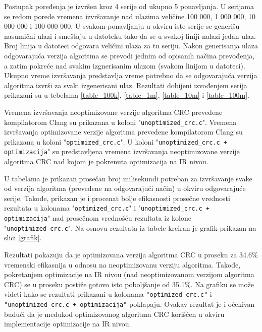 \documentclass[12pt,oneside]{memoir}
\begin{document}
Postupak poređenja je izvršen kroz 4 serije od ukupno 5 ponavljanja. U serijama se redom porede vremena izvršavanje nad ulazima veličine 100 000, 1 000 000, 10 000 000 i 100 000 000. U svakom ponavljanju u okviru iste serije se generišu nasumični ulazi i smeštaju u datoteku tako da se u svakoj liniji nalazi jedan ulaz. Broj linija u datoteci odgovara veličini ulaza za tu seriju. Nakon generisanja ulaza odgovarajuća verzija algoritma se prevodi jednim od opisanih načina prevođenja, a zatim pokreće nad svakim izgnerisanim ulazom (svakom linijom u datoteci). Ukupno vreme izvršavanja predstavlja vreme potrebno da se odgovarajuća verzija algoritma izvrši za svaki izgenerisani ulaz. Rezultati dobijeni izvođenjem serija prikazani su u tebelama \ref{table_100k}, \ref{table_1m}, \ref{table_10m} i \ref{table_100m}.


Vremena izvršavanja neoptimizovane verzije algoritma CRC prevedene kompilatorom Clang su prikazana u koloni "\texttt{unoptimized\_crc.c}". Vremena izvršavanja optimizovane verzije algoritma prevedene kompilatorom Clang su prikazana u koloni "\texttt{optimized\_crc.c}". U koloni "\texttt{unoptimized\_crc.c + optimizacija}" su predstavljena vremena izvršavanja neoptimizovane verzije algoritma CRC nad kojom je pokrenuta optimizacija na IR nivou.

U tabelama je prikazan prosečan broj milisekundi potreban za izvršavanje svake od verzija algoritma (prevedene na odgovarajući način) u okviru odgovarajuće serije. Takođe, prikazan je i procenat bolje efikasnosti prosečne vrednosti rezultata u kolonama "\texttt{optimized\_crc.c}" i "\texttt{unoptimized\_crc.c + optimizacija}" nad prosečnom vrednošću rezultata iz kolone "\texttt{unoptimized\_crc.c}". Na osnovu rezultata iz tabele kreiran je grafik prikazan na slici \ref{grafik}.

Rezultati pokazuju da je optimizovana verzija algoritma CRC u proseku za 34.6\% vremenski efikasnija u odnosu na neoptimizovanu verziju algoritma. Takođe, pokretanjem optimizacije na IR nivou (nad neoptimizovanom verzijom algoritma CRC) se u proseku postiže gotovo isto poboljšanje od 35.1\%. Na grafiku se može videti kako se rezultati prikazani u kolonama \texttt{"optimized\_crc.c"} i \texttt{"unoptimized\_crc.c + optimizacija"} poklapaju. Ovakav rezultat je i očekivan budući da je međukod optimizovanog algoritma CRC korišćen u okviru implementacije optimizacije na IR nivou.
\end{document}
